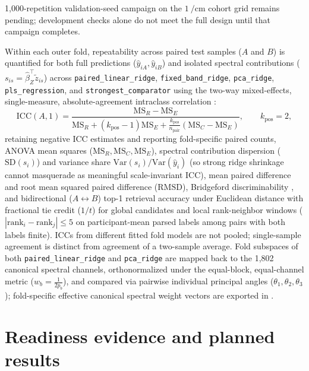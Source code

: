 \documentclass[preprint,12pt]{elsarticle}
\begin{document}
1,000-repetition validation-seed campaign on the $1~\si{\per\centi\metre}$ cohort grid remains pending; development checks alone do not meet the full design until that campaign completes.

Within each outer fold, repeatability across paired test samples ($A$ and $B$) is quantified for both full predictions ($\widehat{y}_{iA}, \widehat{y}_{iB}$) and isolated spectral contributions ($s_{is} = \widehat{\beta}_Z^\top \tilde{z}_{is}$) across \texttt{paired\_linear\_ridge}, \texttt{fixed\_band\_ridge}, \texttt{pca\_ridge}, \texttt{pls\_regression}, and \texttt{strongest\_comparator} using the two-way mixed-effects, single-measure, absolute-agreement intraclass correlation \cite{koo2016, koo2017erratum}:
\begin{equation}
\mathrm{ICC}(A, 1) = \frac{\mathrm{MS}_R - \mathrm{MS}_E}{\mathrm{MS}_R + (k_{\text{pos}} - 1)\mathrm{MS}_E + \frac{k_{\text{pos}}}{n_{\text{pair}}}(\mathrm{MS}_C - \mathrm{MS}_E)}, \qquad k_{\text{pos}} = 2,
\label{eq:icc_a1}
\end{equation}
retaining negative ICC estimates and reporting fold-specific paired counts, ANOVA mean squares ($\mathrm{MS}_R, \mathrm{MS}_C, \mathrm{MS}_E$), spectral contribution dispersion ($\mathrm{SD}(s_i)$) and variance share $\mathrm{Var}(s_i)/\mathrm{Var}(\widehat{y}_i)$ (so strong ridge shrinkage cannot masquerade as meaningful scale-invariant ICC), mean paired difference and root mean squared paired difference ($\mathrm{RMSD}$), Bridgeford discriminability \cite{bridgeford2021}, and bidirectional ($A \leftrightarrow B$) top-1 retrieval accuracy under Euclidean distance with fractional tie credit ($1/t$) for global candidates and local rank-neighbor windows ($|\mathrm{rank}_i - \mathrm{rank}_j| \le 5$ on participant-mean parsed labels among pairs with both labels finite). ICCs from different fitted fold models are not pooled; single-sample agreement is distinct from agreement of a two-sample average. Fold subspaces of both \texttt{paired\_linear\_ridge} and \texttt{pca\_ridge} are mapped back to the 1,802 canonical spectral channels, orthonormalized under the equal-block, equal-channel metric ($w_b = \frac{1}{2 p_b}$), and compared via pairwise individual principal angles ($\theta_1, \theta_2, \theta_3$); fold-specific effective canonical spectral weight vectors are exported in .

\section{Readiness evidence and planned results}
\label{sec:results}
\end{document}
